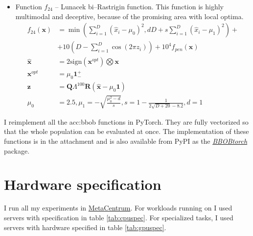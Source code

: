 \begin{itemize}
\begin{align*}
\begin{array}{ll}
\begin{array}{l}
                        \text{sampled randomly without} \\
                        \text{replacement for}\ i \neq 1
                    \end{array}
            \end{array}
        \right.
    \end{align*}
    \item Function $f_{24}$ -- Lunacek bi--Rastrigin function. This function is highly multimodal and deceptive, because of the promising area with local optima.
    \begin{align*}
        f_{24}\left(\mathbf{x}\right) &=
            \min\left( \sum_{i=1}^D\left(\hat{x}_i-\mu_0\right)^2, dD+s\sum_{i=1}^D\left(\hat{x}_i-\mu_1\right)^2 \right) + \\
            &+ 10\left(D-\sum_{i=1}^D \cos\left(2\pi z_i\right)\right)
            + 10^4 f_{pen}\left(\mathbf{x}\right) \\
        \hat{\mathbf{x}} &= 2 \text{sign}\left(\mathbf{x}^{opt}\right) \bigotimes \mathbf{x} \\
        \mathbf{x}^{opt} &= \mu_0 \mathbf{1}^{+}_{-} \\
        \mathbf{z} &= \mathbf{Q}\Lambda^{100}\mathbf{R}\left(\hat{\mathbf{x}}-\mu_0\mathbf{1}\right) \\
        \mu_0&=2.5,\mu_1=-\sqrt{\frac{\mu_0^2-d}{s}}, s=1-\frac{1}{2\sqrt{D+20}-8.2},d=1
    \end{align*}
\end{itemize}

I reimplement all the \acrshort{acc:bbob} functions in PyTorch. They are fully vectorized so that the whole population can be evaluated at once. The implementation of these functions is in the attachment and is also available from PyPI as the \href{https://pypi.org/project/BBOBtorch/}{\textit{BBOBtorch}} package.




\section{Hardware specification}

I run all my experiments in \href{https://metavo.metacentrum.cz/en/}{MetaCentrum}. For workloads running on \cpu I used servers with specification in table \ref{tab:cpuspec}. For \gpu specialized tasks, I used servers with hardware specified in table \ref{tab:gpuspec}.


